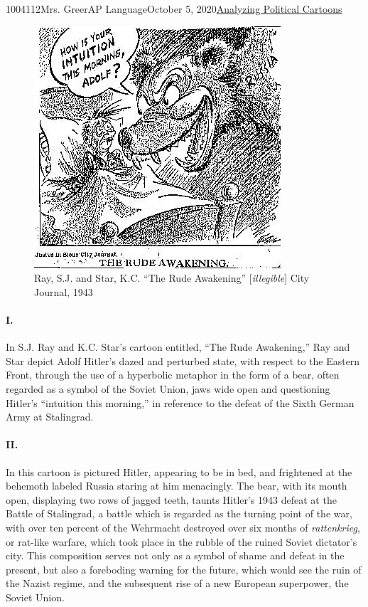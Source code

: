 \documentclass[12pt,letterpaper]{article}
\begin{document}
\begin{mla}{1004112}{}{Mrs. Greer}{AP Language}{October 5, 2020}{\underline{Analyzing Political Cartoons}} 

  \begin{justifying}

    \begin{figure}[h]
      \centering
      \includegraphics[width=.6\textwidth]{Figures/Stalingrad.jpg}
      \caption{Ray, S.J. and Star, K.C. ``The Rude Awakening'' [\textit{illegible}] City Journal, 1943}
      \label{fig:1}
    \end{figure}

    \paragraph{I.} In S.J. Ray and K.C. Star's cartoon entitled, ``The Rude Awakening,'' Ray and Star depict Adolf Hitler's dazed and perturbed state, with respect to the Eastern Front, through the use of a hyperbolic metaphor in the form of a bear, often regarded as a symbol of the Soviet Union, jaws wide open and questioning Hitler's ``intuition this morning,'' in reference to the defeat of the Sixth German Army at Stalingrad.
    \paragraph{II.} In this cartoon is pictured Hitler, appearing to be in bed, and frightened at the behemoth labeled Russia staring at him menacingly. The bear, with its mouth open, displaying two rows of jagged teeth, taunts Hitler's 1943 defeat at the Battle of Stalingrad, a battle which is regarded as the turning point of the war, with over ten percent of the Wehrmacht destroyed over six months of \textit{rattenkrieg}, or rat-like warfare, which took place in the rubble of the ruined Soviet dictator's city. This composition serves not only as a symbol of shame and defeat in the present, but also a foreboding warning for the future, which would see the ruin of the Nazist regime, and the subsequent rise of a new European superpower, the Soviet Union.

\end{justifying}
\end{mla}
\end{document}
